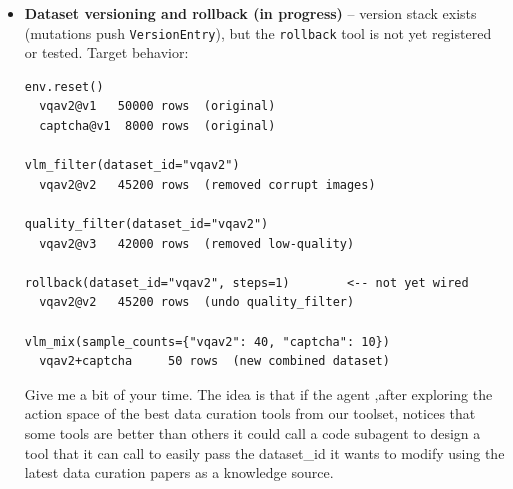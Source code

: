 \begin{itemize}
    \item \textbf{Dataset versioning and rollback (in progress)} -- version stack exists (mutations push \texttt{VersionEntry}), but the \texttt{rollback} tool is not yet registered or tested.
    Target behavior:

\begin{verbatim}
env.reset()
  vqav2@v1   50000 rows  (original)
  captcha@v1  8000 rows  (original)

vlm_filter(dataset_id="vqav2")
  vqav2@v2   45200 rows  (removed corrupt images)

quality_filter(dataset_id="vqav2")
  vqav2@v3   42000 rows  (removed low-quality)

rollback(dataset_id="vqav2", steps=1)        <-- not yet wired
  vqav2@v2   45200 rows  (undo quality_filter)

vlm_mix(sample_counts={"vqav2": 40, "captcha": 10})
  vqav2+captcha     50 rows  (new combined dataset)
\end{verbatim}

    \noindent Give me a bit of your time. The idea is that if the agent ,after exploring the action space of the best data curation tools from our toolset, notices that some tools are better than others it could call a code subagent to design a tool that it can call to easily pass the dataset\_id it wants to modify using the latest data curation papers as a knowledge source.
\end{itemize}



